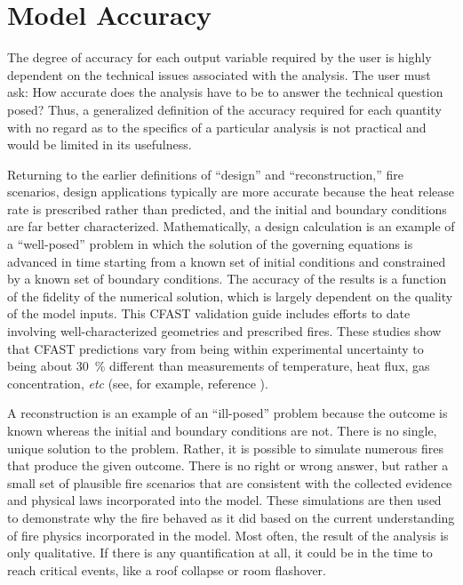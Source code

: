 \section{Model Accuracy}

The degree of  accuracy for each output variable  required by the user is  highly  dependent on  the  technical  issues  associated with  the analysis.  The user  must ask: How accurate does  the analysis have to be  to  answer  the  technical  question posed?  Thus,  a  generalized definition of the  accuracy required for each quantity  with no regard as  to the specifics  of a  particular analysis  is not  practical and would be limited in its usefulness.

Returning   to    the   earlier   definitions    of   ``design''   and ``reconstruction,'' fire scenarios, design applications  typically are  more accurate because the heat release rate is prescribed rather than predicted, and the    initial    and    boundary    conditions   are    far    better characterized. Mathematically, a design calculation is an example of a ``well-posed''  problem  in  which   the  solution  of  the  governing equations is  advanced in  time starting from  a known set  of initial conditions and constrained by a known set of boundary conditions.  The accuracy of the results is a function of the fidelity of the numerical solution, which is  largely dependent on the quality of the model inputs. This CFAST validation guide includes efforts to date involving well-characterized geometries and prescribed fires. These studies show that  CFAST predictions vary from being within experimental   uncertainty  to  being   about  30~\%   different  than measurements of temperature, heat flux, gas concentration, {\em etc} (see, for example, reference \cite{NRCNUREG1824}).

A reconstruction is an example of an ``ill-posed'' problem because the outcome  is known  whereas  the initial  and  boundary conditions  are not. There is  no single, unique solution to the  problem. Rather, it is possible to simulate numerous fires that produce the given outcome. There is no right or wrong answer, but rather a small set of plausible fire scenarios that are  consistent with the collected evidence and physical laws incorporated into the model. These simulations are then used to demonstrate why the fire behaved as it did  based on the current understanding of fire physics  incorporated in  the model.  Most  often, the  result of  the
analysis is only  qualitative. If there is any  quantification at all, it could be in the time to reach critical events, like a roof collapse or room flashover.

